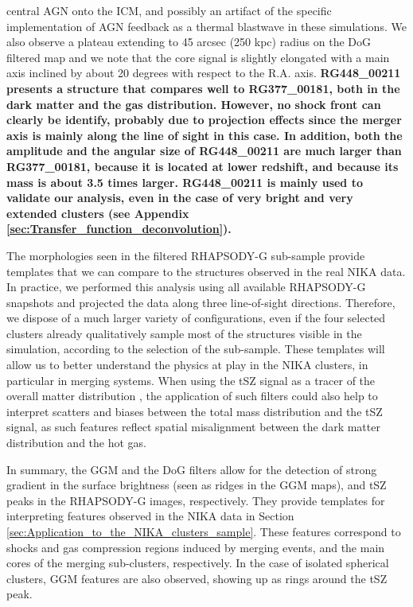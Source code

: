 \documentclass[twocolumn,traditabstract]{aa}
\begin{document}
central AGN onto the ICM, and possibly an artifact of the specific implementation of AGN feedback as a thermal blastwave in these simulations. We also observe a plateau extending to 45 arcsec (250 kpc) radius on the DoG filtered map and we note that the core signal is slightly elongated with a main axis inclined by about 20 degrees with respect to the R.A. axis. {\bf RG448\_00211 presents a structure that compares well to RG377\_00181, both in the dark matter and the gas distribution. However, no shock front can clearly be identify, probably due to projection effects since the merger axis is mainly along the line of sight in this case. In addition, both the amplitude and the angular size of RG448\_00211 are much larger than RG377\_00181, because it is located at lower redshift, and because its mass is about 3.5 times larger. RG448\_00211 is mainly used to validate our analysis, even in the case of very bright and very extended clusters (see Appendix \ref{sec:Transfer_function_deconvolution}).}

The morphologies seen in the filtered RHAPSODY-G sub-sample provide templates that we can compare to the structures observed in the real NIKA data. In practice, we performed this analysis using all available RHAPSODY-G snapshots and projected the data along three line-of-sight directions. Therefore, we dispose of a much larger variety of configurations, even if the four selected clusters already qualitatively sample most of the structures visible in the simulation, according to the selection of the sub-sample. These templates will allow us to better understand the physics at play in the NIKA clusters, in particular in merging systems. When using the tSZ signal as a tracer of the overall matter distribution \citep[e.g.][]{Adam2015,Adam2016a,Ruppin2016}, the application of such filters could also help to interpret scatters and biases between the total mass distribution and the tSZ signal, as such features reflect spatial misalignment between the dark matter distribution and the hot gas.

In summary, the GGM and the DoG filters allow for the detection of strong gradient in the surface brightness (seen as ridges in the GGM maps), and tSZ peaks in the RHAPSODY-G images, respectively. They provide templates for interpreting features observed in the NIKA data in Section \ref{sec:Application_to_the_NIKA_clusters_sample}. These features correspond to shocks and gas compression regions induced by merging events, and the main cores of the merging sub-clusters, respectively. In the case of isolated spherical clusters, GGM features are also observed, showing up as rings around the tSZ peak.
\end{document}
